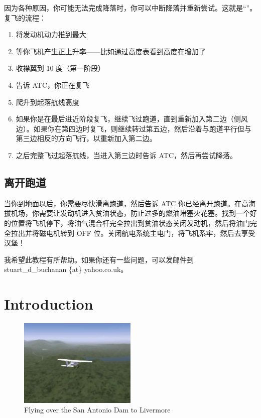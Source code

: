 因为各种原因，你可能无法完成降落时，你可以中断降落并重新尝试。这就是“”。复飞的流程：

\begin{enumerate}

\item 将发动机动力推到最大
\item 等你飞机产生正上升率——比如通过高度表看到高度在增加了
\item 收襟翼到 10 度（第一阶段）
\item 告诉 ATC，你正在复飞
\item 爬升到起落航线高度
\item 如果你是在最后进近阶段复飞，继续飞过跑道，直到重新加入第二边（侧风边）。如果你在第四边时复飞，则继续转过第五边，然后沿着与跑道平行但与第三边相反的方向飞行，以重新加入第二边。
\item 之后完整飞过起落航线，当进入第三边时告诉 ATC，然后再尝试降落。
\end{enumerate}

\subsection{离开跑道}

当你到地面以后，你需要尽快滑离跑道，然后告诉 ATC 你已经离开跑道。在高海拔机场，你需要让发动机进入贫油状态，防止过多的燃油堵塞火花塞。找到一个好的位置将飞机停下，将油气混合杆完全拉出到贫油状态关闭发动机，然后将油门完全拉出并将磁电机转到 OFF 位。关闭航电系统主电门，将飞机系牢，然后去享受汉堡！

我希望此教程有所帮助。如果你还有一些问题，可以发邮件到 stuart\_d\_buchanan \{at\} yahoo.co.uk。

\iffalse
\section{Introduction}

\begin{figure}[!htp]
\centering
\includegraphics[width=0.5\textwidth]{antonio2}
\caption{Flying over the San Antonio Dam to Livermore}
\end{figure}


